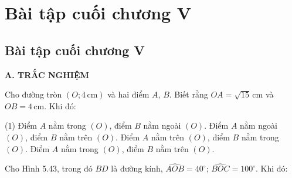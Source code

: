 %

\section*{Bài tập cuối chương V}

\begin{exercises}
    \subsection{Bài tập cuối chương V}

    \textbf{A. TRẮC NGHIỆM}

    \begin{questions}[resume=SGK]
        \item Cho đường tròn $(O; 4\,\mathrm{cm})$ và hai điểm $A$, $B$. Biết rằng $OA=\sqrt{15}\,\mathrm{cm}$ và $OB=4\,\mathrm{cm}$. Khi đó:
        \begin{tasks}(1)
            \task[(A)] Điểm $A$ nằm trong $(O)$, điểm $B$ nằm ngoài $(O)$.
            \task[(B)] Điểm $A$ nằm ngoài $(O)$, điểm $B$ nằm trên $(O)$.
            \task[(C)] Điểm $A$ nằm trên $(O)$, điểm $B$ nằm trong $(O)$.
            \task[(D)] Điểm $A$ nằm trong $(O)$, điểm $B$ nằm trên $(O)$.
        \end{tasks}
        \par\noindent\answerbox\par

        \item Cho Hình 5.43, trong đó $BD$ là đường kính, $\widehat{AOB}=40^\circ$; $\widehat{BOC}=100^\circ$. Khi đó:

        \begin{center}
\end{center}
\end{questions}
\end{exercises}
